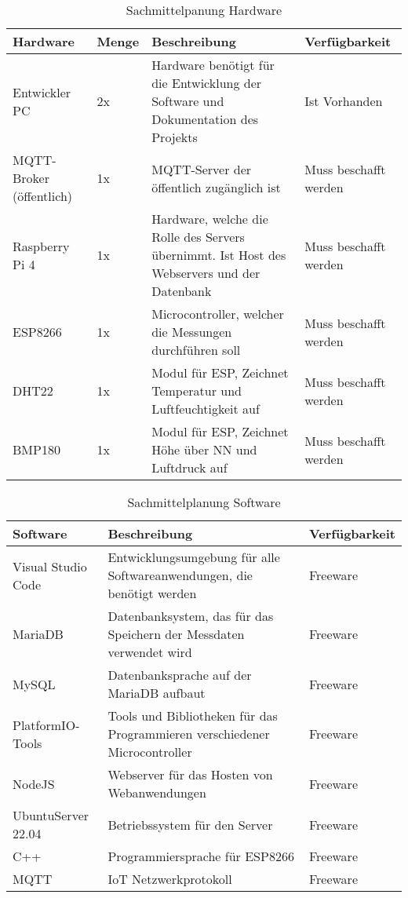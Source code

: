 \begin{table} [H]
	\caption{Sachmittelpanung Hardware}
	\begin{tabularx}{\textwidth}{|l|l|X|l|}
		\hline
		\textbf{Hardware} & \textbf{Menge} & \textbf{Beschreibung} & \textbf{Verfügbarkeit} \\
		\hline
		Entwickler PC & 2x & Hardware benötigt für die Entwicklung der Software und Dokumentation des Projekts & Ist Vorhanden \\
		\hline
		MQTT-Broker (öffentlich) & 1x & MQTT-Server der öffentlich zugänglich ist & Muss beschafft werden \\
		\hline
		Raspberry Pi 4 & 1x & Hardware, welche die Rolle des Servers übernimmt. Ist Host des Webservers und der Datenbank & Muss beschafft werden \\
		\hline
		ESP8266 & 1x & Microcontroller, welcher die Messungen durchführen soll & Muss beschafft werden \\
		\hline
		DHT22 & 1x & Modul für ESP, Zeichnet Temperatur und Luftfeuchtigkeit auf & Muss beschafft werden \\
		\hline
		BMP180 & 1x & Modul für ESP, Zeichnet Höhe über NN und Luftdruck auf & Muss beschafft werden \\
		\hline
	\end{tabularx}
\end{table}
\begin{table} [H]
	\caption{Sachmittelplanung Software}
	\begin{tabularx}{\textwidth}{|l|X|l|}
		\hline
		\textbf{Software} & \textbf{Beschreibung} & \textbf{Verfügbarkeit} \\
		\hline
		Visual Studio Code &  Entwicklungsumgebung für alle Softwareanwendungen, die benötigt werden & Freeware \\
		\hline
		MariaDB & Datenbanksystem, das für das Speichern der Messdaten verwendet wird & Freeware \\
		\hline
		MySQL & Datenbanksprache auf der MariaDB aufbaut & Freeware \\
		\hline
		PlatformIO-Tools & Tools und Bibliotheken für das Programmieren verschiedener Microcontroller & Freeware \\
		\hline
		NodeJS & Webserver für das Hosten von Webanwendungen & Freeware \\
		\hline
		UbuntuServer 22.04 & Betriebssystem für den Server & Freeware \\
		\hline
		C++ & Programmiersprache für ESP8266 & Freeware \\
		\hline
		MQTT & IoT Netzwerkprotokoll & Freeware \\
		\hline
	\end{tabularx}
\end{table}